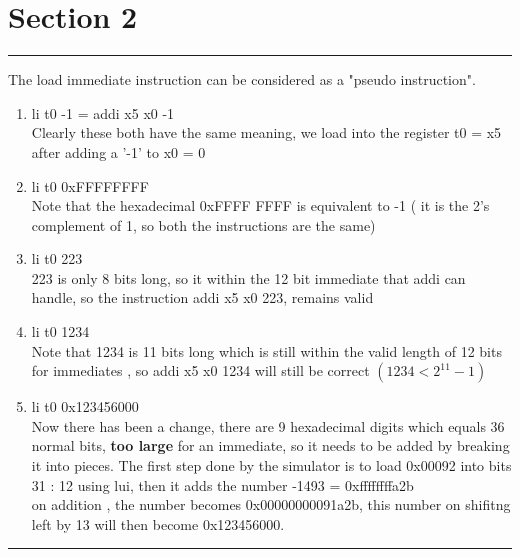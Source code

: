 
\section{Section 2}
\vspace{7pt}
\hrule
\vspace{7pt}
The load immediate instruction can be considered as a "pseudo instruction".
\begin{enumerate}
    \item li t0 -1  = addi x5 x0 -1
    \\Clearly these both have the same meaning, we load into the register t0  = x5 after adding a '-1' to x0 = 0
    \item li t0 0xFFFFFFFF
    \\ Note that the hexadecimal 0xFFFF FFFF is equivalent to -1  ( it is the 2's complement of 1, so both the instructions are the same)
    \item li t0 223
    \\ 223 is only 8 bits long, so it within the 12 bit immediate that addi can handle, 
    so the instruction addi x5 x0 223, remains valid
    \item li t0 1234 
     \\ Note that 1234 is 11 bits long which is still within the valid length of 12 bits for immediates , so addi x5 x0 1234 
     will still be correct $(1234 < 2^{11} - 1)$
    \item li t0 0x123456000
    \\ Now there has been a change, there are 9 hexadecimal digits which equals 36 normal bits, \textbf{too large} for an immediate, so it needs to be added by breaking it into pieces.
    The first step done by the simulator is to load 0x00092 into bits 31 : 12 using lui, then it adds the number -1493 = 0xffffffffa2b\\
    on addition , the number becomes 0x00000000091a2b, this number on shifitng left by 13 will then become 0x123456000.
\end{enumerate}
\vspace{7pt}
\hrule